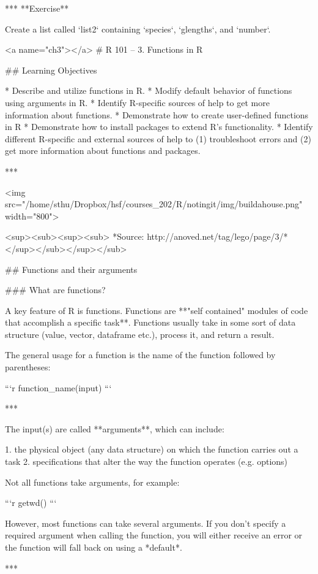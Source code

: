 {{***
**Exercise**

Create a list called `list2` containing `species`, `glengths`, and `number`.





<a name="ch3"></a>
# R 101 -- 3. Functions in R

## Learning Objectives

* Describe and utilize functions in R. 
* Modify default behavior of functions using arguments in R.
* Identify R-specific sources of help to get more information about functions.
* Demonstrate how to create user-defined functions in R
* Demonstrate how to install packages to extend R’s functionality. 
* Identify different R-specific and external sources of help to (1) troubleshoot errors and (2) get more information about functions and packages.

***

<img src="/home/sthu/Dropbox/hsf/courses_202/R/notingit/img/buildahouse.png" width="800">

<sup><sub><sup><sub>
*Source: http://anoved.net/tag/lego/page/3/* 
</sup></sub></sup></sub>

## Functions and their arguments

### What are functions?

A key feature of R is functions. Functions are **"self contained" modules of code that accomplish a specific task**. Functions usually take in some sort of data structure (value, vector, dataframe etc.), process it, and return a result.

The general usage for a function is the name of the function followed by parentheses:

```r
function_name(input)
```

***

The input(s) are called **arguments**, which can include:

1. the physical object (any data structure) on which the function carries out a task 
2. specifications that alter the way the function operates (e.g. options)

Not all functions take arguments, for example:

```r
getwd()
```

However, most functions can take several arguments. If you don't specify a required argument when calling the function, you will either receive an error or the function will fall back on using a *default*. 

***

}}
